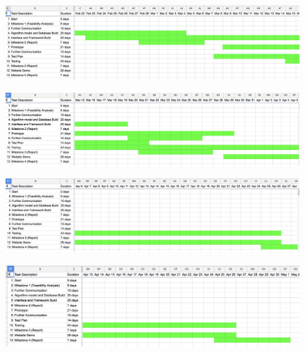 \documentclass{article}
\begin{document}
\hfill \break
\begin{figure}[ht]
\includegraphics[scale=0.5,angle=270]{2.png}
\end{figure}

\hfill \break
\begin{figure}[ht]
\includegraphics[scale=0.5,angle=270]{3.png}
\end{figure}

\hfill \break
\begin{figure}[ht]
\includegraphics[scale=0.5,angle=270]{4.png}
\end{figure}

\hfill \break
\begin{figure}[ht]
\includegraphics[scale=0.5,angle=270]{5.png}
\end{figure}
\end{document}
